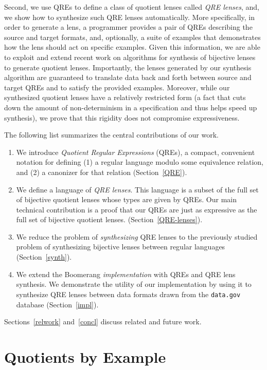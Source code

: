 \documentclass[acmsmall,review,anonymous]{acmart}
\begin{document}
Second, we use QREs to define a class of quotient lenses called {\em QRE
lenses}, and, we show how to synthesize such QRE
lenses automatically.
More specifically, in
order to generate a lens, a programmer provides a pair of QREs
describing the source and target formats, and, optionally,
a suite of examples that demonstrates how the
lens should act on specific examples.  Given this information,
we are able to exploit and extend recent work on algorithms for synthesis of
bijective lenses~\cite{optician} to generate quotient lenses.
Importantly, the lenses generated by
our synthesis algorithm are guaranteed to translate data back and forth
between source and target QREs and to satisfy the provided examples.
Moreover, while our synthesized quotient lenses have a relatively
restricted form (a fact that cuts down the amount of non-determinism in
a specification and thus helps speed up synthesis), we prove that
this rigidity does not compromise expressiveness.

The following list summarizes the central contributions of our work.
\begin{enumerate}
  \item We introduce {\em Quotient Regular Expressions} (QREs),
  a compact, convenient notation for defining (1) a
  regular language modulo some equivalence relation, and (2) a canonizer
  for that relation (Section~\ref{QRE}).
  \item We define a language of {\em QRE lenses}.  This language is
  a subset of the full set of bijective quotient
  lenses whose types are given by QREs. Our main technical contribution
  is a proof that our QREs are just as expressive as the full set of bijective
  quotient lenses.
  (Section~\ref{QRE-lenses}).
  \item We reduce the problem of {\em synthesizing}
  QRE lenses to the previously studied problem of synthesizing bijective lenses
  between regular languages (Section~\ref{synth}).
  \item We extend the Boomerang {\em implementation} with QREs
  and QRE lens synthesis.  We demonstrate the utility of our
  implementation by using it to
  synthesize QRE lenses between data formats drawn from the
  {\tt data.gov} database (Section~\ref{impl}).
\end{enumerate}
Sections~\ref{relwork} and~\ref{concl} discuss related and future work.

\section{Quotients by Example}
\label{sec:example}
\end{document}
